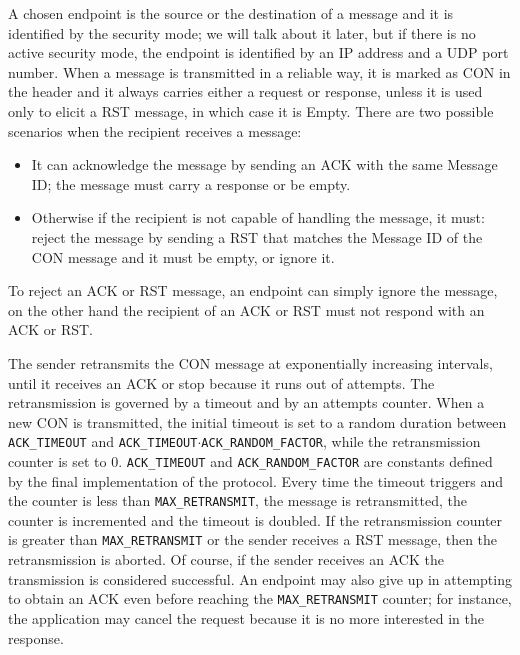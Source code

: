 	A chosen endpoint is the source or the destination of a message and it is identified by the security mode; we will talk about it later, but if there is no active security mode, the endpoint is identified by an IP address and a UDP port number.\newline
	When a message is transmitted in a reliable way, it is marked as CON in the header and it always carries either a request or response, unless it is used only to elicit a RST message, in which case it is Empty.\newline
	There are two possible scenarios when the recipient receives a message:\newline
		\begin{itemize}
		\item It can acknowledge the message by sending an ACK with the same Message ID; the message must carry a response or be empty.
		\item Otherwise if the recipient is not capable of handling the message, it must: reject the message by sending a RST that matches the Message ID of the CON message and it must be empty, or ignore it.
	\end{itemize}

	To reject an ACK or RST message, an endpoint can simply ignore the message, on the other hand
	the recipient of an ACK or RST must not respond with an ACK or RST.\newline
	
	The sender retransmits the CON message at exponentially increasing intervals, 
	until it receives an ACK or stop because it runs out of attempts.\newline
	The retransmission is governed by a timeout and by an attempts counter.\newline
	When a new CON is transmitted, the initial timeout is set to a random duration between
	\texttt{ACK\_TIMEOUT} 
	and \texttt{ACK\_TIMEOUT$\cdot$ACK\_RANDOM\_FACTOR}, while the retransmission counter is set to 0.\newline
	\texttt{ACK\_TIMEOUT} and \texttt{ACK\_RANDOM\_FACTOR} are constants defined by the final implementation of the protocol.\newline
	Every time the timeout triggers and the counter is less than \texttt{MAX\_RETRANSMIT}, the message is retransmitted, the counter is incremented and the timeout is doubled.\newline
	If the retransmission counter is greater than \texttt{MAX\_RETRANSMIT} or the sender receives a RST message, then the retransmission is aborted.\newline
	Of course, if the sender receives an ACK the transmission is considered successful.\newline
	An endpoint may also give up in attempting to obtain an ACK even before reaching the \texttt{MAX\_RETRANSMIT} counter; for instance, the application may cancel the request because it is no more interested in the response.\newline
	
